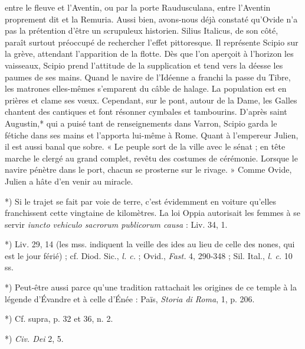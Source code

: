 \documentclass[a4paper, 11pt, oneside, polutonikogreek, french]{article}
\begin{document}
entre le fleuve et l'Aventin, ou par la porte Raudusculana, entre l'Aventin proprement dit et la Remuria. Aussi bien, avons-nous déjà constaté qu'Ovide n'a pas la prétention d'être un scrupuleux historien. Silius Italicus, de son côté, paraît surtout préoccupé de rechercher l'effet pittoresque. Il représente Scipio sur la grève, attendant l'apparition de la flotte. Dès que l'on aperçoit à l'horizon les vaisseaux, Scipio prend l'attitude de la supplication et tend vers la déesse les paumes de ses mains. Quand le navire de l'Idéenne a franchi la passe du Tibre, les matrones elles-mêmes s'emparent du câble de halage. La population est en prières et clame ses vœux. Cependant, sur le pont, autour de la Dame, les Galles chantent des cantiques et font résonner cymbales et tambourins. D'après saint Augustin,* qui a puisé tant de renseignements dans Varron, Scipio garda le fétiche dans ses mains et l'apporta lui-même à Rome. Quant à l'empereur Julien, il est aussi banal que sobre. « Le peuple sort de la ville avec le sénat ; en tête marche le clergé au grand complet, revêtu des costumes de cérémonie. Lorsque le navire pénètre dans le port, chacun se prosterne sur le rivage. » Comme Ovide, Julien a hâte d'en venir au miracle.

*) Si le trajet se fait par voie de terre, c'est évidemment en voiture qu'elles franchissent cette vingtaine de kilomètres. La loi Oppia autorisait les femmes à se servir \emph{iuncto vehiculo sacrorum publicorum causa} : Liv. 34, 1.

*) Liv.  29, 14 (les mss. indiquent la veille des ides au lieu de celle des nones, qui est le jour férié) ; cf. Diod. Sic., \emph{l. c.} ; Ovid., \emph{Fast.} 4, 290-348 ; Sil. Ital., \emph{l. c.} 10 ss.

*) Peut-être aussi parce qu'une tradition rattachait les origines de ce temple à la légende d'Évandre et à celle d'Énée : Païs, \emph{Storia di Roma}, 1, p. 206.

*) Cf. supra, p. 32 et 36, n. 2.

*) \emph{Civ. Dei} 2, 5.
\end{document}
